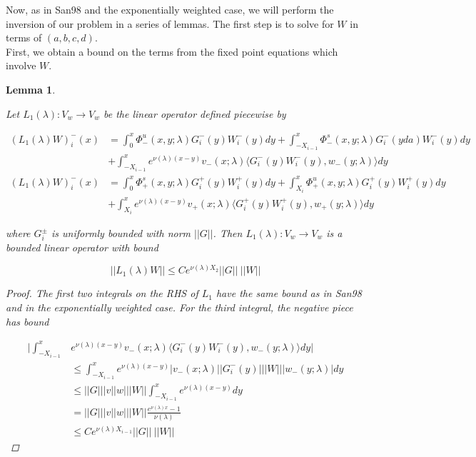 \documentclass[12pt]{article}
\newtheorem{lemma}{Lemma}
\begin{document}
Now, as in San98 and the exponentially weighted case, we will perform the inversion of our problem in a series of lemmas. The first step is to solve for $W$ in terms of $(a, b, c, d)$.\\

First, we obtain a bound on the terms from the fixed point equations which involve $W$. 


\begin{lemma}\label{L1}

Let $L_1(\lambda): V_w \rightarrow V_w$ be the linear operator defined piecewise by

\begin{align*}
(L_1(\lambda)W)_i^-(x) &= \int_0^x \Phi^u_-(x, y; \lambda) G_i^-(y)W_i^-(y) dy + \int_{-X_{i-1}}^x \Phi^s_-(x, y; \lambda) G_i^-(yda)W_i^-(y) dy \\
&+ \int_{-X_{i-1}}^x 
e^{\nu(\lambda)(x-y)} v_-(x; \lambda) \langle G_i^-(y)W_i^-(y), w_-(y; \lambda) \rangle dy \\
(L_1(\lambda)W)_i^-(x) &= \int_0^x \Phi^s_+(x, y; \lambda) G_i^+(y) W_i^+(y) dy + \int_{X_i}^x \Phi^u_+(x, y; \lambda) G_i^+(y) W_i^+(y) dy \\
&+ \int_{X_i}^x e^{\nu(\lambda)(x-y)} v_+(x; \lambda) \langle G_i^+(y)W_i^+(y), w_+(y; \lambda) \rangle dy
\end{align*}

where $G_i^\pm$ is uniformly bounded with norm $||G||$. Then $L_1(\lambda): V_w \rightarrow V_w$ is a bounded linear operator with bound

\begin{equation}\label{L1bound}
||L_1(\lambda)W|| \leq C e^{\nu(\lambda)X_2} ||G|| \: ||W||
\end{equation}

\begin{proof}
The first two integrals on the RHS of $L_1$ have the same bound as in San98 and in the exponentially weighted case. For the third integral, the negative piece has bound

\begin{align*}
\Big| \int_{-X_{i-1}}^x &e^{\nu(\lambda)(x-y)} v_-(x; \lambda) \langle G_i^-(y)W_i^-(y), w_-(y; \lambda) \rangle dy \Big| \\
&\leq \int_{-X_{i-1}}^x e^{\nu(\lambda)(x-y)} |v_-(x; \lambda)| |G_i^-(y)|||W|||w_-(y; \lambda)|dy \\
&\leq ||G|||v||w|||W|| \int_{-X_{i-1}}^x e^{\nu(\lambda)(x-y)} dy \\
&= ||G|||v||w|||W|| \frac{e^{\nu(\lambda)x} - 1}{\nu(\lambda)} \\
&\leq C e^{\nu(\lambda)X_{i-1}} ||G|| \: ||W||
\end{align*}


\end{proof}
\end{lemma}
\end{document}
